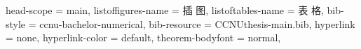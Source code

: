 {{      %
    head-scope = main,
    listoffigures-name = {插 \quad 图},
    listoftables-name  = {表 \quad 格},
    bib-style = ccnu-bachelor-numerical,
    bib-resource = {CCNUthesis-main.bib},
    hyperlink = none,
    hyperlink-color = default,
    theorem-bodyfont = normal,
  }
}


